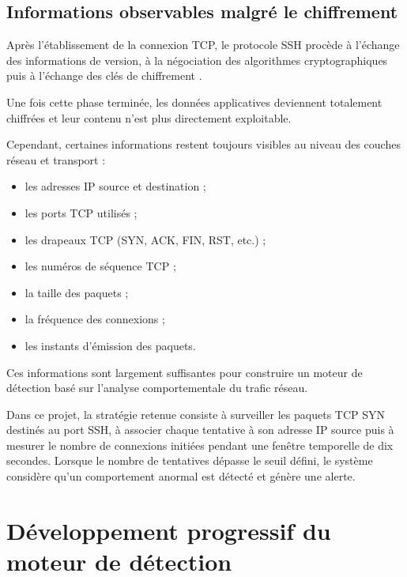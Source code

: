 \subsection{Informations observables malgré le chiffrement}

Après l'établissement de la connexion TCP, le protocole SSH procède à l'échange des informations de version, à la négociation des algorithmes cryptographiques puis à l'échange des clés de chiffrement \cite{rfc4253}.

Une fois cette phase terminée, les données applicatives deviennent totalement chiffrées et leur contenu n'est plus directement exploitable.

Cependant, certaines informations restent toujours visibles au niveau des couches réseau et transport :

\begin{itemize}

\item les adresses IP source et destination ;

\item les ports TCP utilisés ;

\item les drapeaux TCP (SYN, ACK, FIN, RST, etc.) \cite{rfc793} ;

\item les numéros de séquence TCP ;

\item la taille des paquets ;

\item la fréquence des connexions ;

\item les instants d'émission des paquets.

\end{itemize}

Ces informations sont largement suffisantes pour construire un moteur de détection basé sur l'analyse comportementale du trafic réseau.

Dans ce projet, la stratégie retenue consiste à surveiller les paquets TCP SYN destinés au port SSH, à associer chaque tentative à son adresse IP source puis à mesurer le nombre de connexions initiées pendant une fenêtre temporelle de dix secondes. Lorsque le nombre de tentatives dépasse le seuil défini, le système considère qu'un comportement anormal est détecté et génère une alerte.

\section{Développement progressif du moteur de détection}

